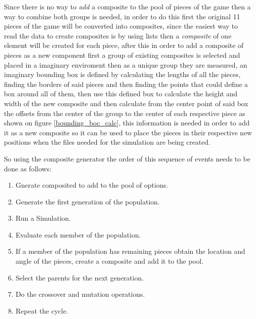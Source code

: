 \documentclass[conference]{IEEEtran}
\begin{document}
    Since there is no way to \textit{add} a composite to the pool of pieces of the 
    game then a way to combine both groups is needed, in order to do this first the 
    original 11 pieces of the game will be converted into composites, since the easiest
    way to read the data to create composites is by using lists then a \textit{composite} 
    of one element will be created for each piece, after this in order to add a 
    composite of pieces as a new component first a group of existing composites is 
    selected and placed in a imaginary enviroment then as a unique group they are 
    measured, an imaginary bounding box is defined by calculating the lengths of all
    the pieces, finding the borders of said pieces and then finding the points that could
    define a box around all of them, then use this defined box to calculate the 
    height and width of the new composite and then calculate from 
    the center point of said box the offsets from the center of the
    group to the center of each respective piece as shown on figure
    \ref{bounding_boc_calc}, this information is needed in order to add it as a new
    composite so it can be used to place the pieces in their respective new positions
    when the files needed for the simulation are being created.
    
    So using the composite generator the order of this sequence of
    events needs to be done as follows:
    
    
    
    
    \begin{enumerate}
    \item Gnerate composited to add to the pool of options.
    \item Generate the first generation of the population.
    \item Run a Simulation.
    \item Evaluate each member of the population.
    \item If a member of the population has remaining pieces obtain the location and
    angle of the pieces, create a composite and add it to the pool.
    \item Select the parents for the next generation.
    \item Do the crossover and mutation operations.
    \item Repeat the cycle.
    \end{enumerate}
    
\end{document}
